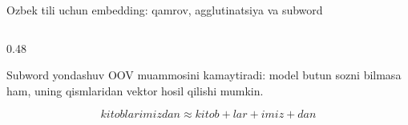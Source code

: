 \documentclass[aspectratio=169,11pt]{beamer}
\begin{document}
\begin{frame}{O\textquotesingle{}zbek tili uchun embedding: qamrov, agglutinatsiya va subword}
\begin{columns}[T,totalwidth=\textwidth]
\begin{column}{0.48\textwidth}
\vspace{3pt}

\begin{tcolorbox}[defbox,left=2mm,right=2mm,top=1mm,bottom=1mm]
\scriptsize
Subword yondashuv OOV muammosini kamaytiradi: model butun so\textquotesingle{}zni
bilmasa ham, uning qismlaridan vektor hosil qilishi mumkin.
\end{tcolorbox}

\vspace{2pt}

\[
\textit{kitoblarimizdan}
\approx
\textit{kitob}+\textit{lar}+\textit{imiz}+\textit{dan}
\]

\end{column}
\end{columns}

\end{frame}
\end{document}
